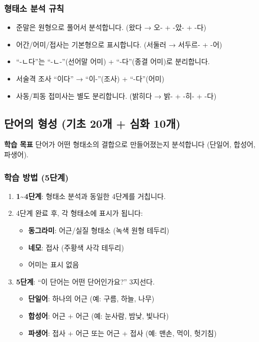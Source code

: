 \documentclass[11pt,a4paper]{article}
\newcommand{\goalbox}[1]{%
  \vspace{0.3cm}
  \noindent\colorbox{lightbg}{\parbox{\dimexpr\textwidth-2\fboxsep}{%
    \textbf{\color{korfarm}학습 목표} \quad #1%
  }}
  \vspace{0.3cm}
}
\begin{document}
\subsubsection{형태소 분석 규칙}
\begin{itemize}[nosep,leftmargin=*]
  \item 준말은 원형으로 풀어서 분석합니다. (왔다 → 오- + -았- + -다)
  \item 어간/어미/접사는 기본형으로 표시합니다. (서둘러 → 서두르- + -어)
  \item ``-ㄴ다''는 ``-ㄴ-''(선어말 어미) + ``-다''(종결 어미)로 분리합니다.
  \item 서술격 조사 ``이다'' → ``이-''(조사) + ``-다''(어미)
  \item 사동/피동 접미사는 별도 분리합니다. (밝히다 → 밝- + -히- + -다)
\end{itemize}

\newpage
\subsection{단어의 형성 (기초 20개 + 심화 10개)}
\goalbox{단어가 어떤 형태소의 결합으로 만들어졌는지 분석합니다 (단일어, 합성어, 파생어).}

\subsubsection{학습 방법 (5단계)}
\begin{enumerate}[nosep,leftmargin=*]
  \item \textbf{1\textasciitilde{}4단계}: 형태소 분석과 동일한 4단계를 거칩니다.
  \item 4단계 완료 후, 각 형태소에 표시가 됩니다:
    \begin{itemize}[nosep]
      \item {\color{korfarmGreen}\textbf{동그라미}}: 어근/실질 형태소 (녹색 원형 테두리)
      \item {\color{korfarm}\textbf{네모}}: 접사 (주황색 사각 테두리)
      \item 어미는 표시 없음
    \end{itemize}
  \item \textbf{5단계}: ``이 단어는 어떤 단어인가요?'' 3지선다.
    \begin{itemize}[nosep]
      \item \textbf{단일어}: 하나의 어근 (예: 구름, 하늘, 나무)
      \item \textbf{합성어}: 어근 + 어근 (예: 눈사람, 밤낮, 빛나다)
      \item \textbf{파생어}: 접사 + 어근 또는 어근 + 접사 (예: 맨손, 먹이, 헛기침)
    \end{itemize}
\end{enumerate}
\end{document}
